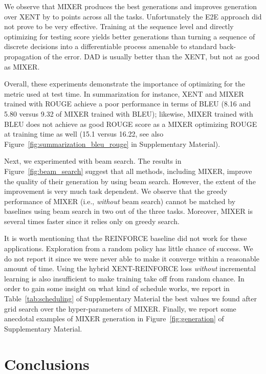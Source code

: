 \documentclass{article} \usepackage{iclr2016_conference,times}
\begin{document}
We observe that MIXER produces the best generations and improves generation over XENT by  to  points across all the tasks. 
Unfortunately the E2E approach did not prove to be very effective. Training at the sequence level and directly optimizing for testing score yields better generations than turning a sequence of discrete decisions into a differentiable process amenable to standard back-propagation of the error. 
DAD is usually better than the XENT, but not as good as MIXER.  

Overall, these experiments demonstrate the importance of optimizing for the metric used at test time. In summarization for instance, XENT and MIXER trained with ROUGE achieve a poor performance in terms of BLEU (8.16 and 5.80 versus 9.32 of MIXER trained with BLEU); likewise, MIXER trained with BLEU does not achieve as good ROUGE score as 
a MIXER optimizing ROUGE at training time as well (15.1 versus 16.22, see also Figure~\ref{fig:summarization_bleu_rouge} in Supplementary Material).

Next, we experimented with beam search. The results in Figure~\ref{fig:beam_search} suggest that all methods, including MIXER, improve the quality of their generation by using beam search. However, the extent of the improvement is very much task dependent. We observe that the greedy performance of MIXER (i.e., {\em without} beam search) cannot be matched by baselines using beam search in two out of the three tasks. Moreover, MIXER is several times faster since it relies only on greedy search.

It is worth mentioning that the REINFORCE baseline did not work for these applications. Exploration from a random policy has little chance of success. We do not report it since we were never able to make it converge within a reasonable amount of time. Using the hybrid XENT-REINFORCE loss {\em without} incremental learning is also insufficient to make training take off from random chance. In order to gain some insight on what kind of schedule works, we report in Table~\ref{tab:scheduling} of Supplementary Material the best values we found after grid search over the hyper-parameters of MIXER.
Finally, we report some anecdotal examples of MIXER generation in Figure~\ref{fig:generation} of Supplementary Material. 
 \section{Conclusions}
\end{document}
